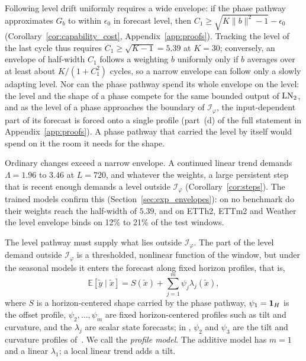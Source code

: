 {
Following level drift uniformly requires a wide envelope: if the phase pathway approximates $G_b$ to within $\epsilon_0$ in forecast level, then $C_1\ge\sqrt{K\|b\|^2-1}-\epsilon_0$ (Corollary~\ref{cor:capability_cost}, Appendix~\ref{app:proofs}). Tracking the level of the last cycle thus requires $C_1\ge\sqrt{K-1}=5.39$ at $K=30$; conversely, an envelope of half-width $C_1$ follows a weighting $b$ uniformly only if $b$ averages over at least about $K/(1+C_1^2)$ cycles, so a narrow envelope can follow only a slowly adapting level. Nor can the phase pathway spend its whole envelope on the level: the level and the shape of a phase compete for the same bounded output of $\operatorname{LN}_2$, and as the level of a phase approaches the boundary of $\mathcal I_\varphi$, the input-dependent part of its forecast is forced onto a single profile (part~(d) of the full statement in Appendix~\ref{app:proofs}). A phase pathway that carried the level by itself would spend on it the room it needs for the shape.

Ordinary changes exceed a narrow envelope. A continued linear trend demands $\Lambda=1.96$ to $3.46$ at $L=720$, and whatever the weights, a large persistent step that is recent enough demands a level outside $\mathcal I_\varphi$ (Corollary~\ref{cor:steps}). The trained models confirm this (Section~\ref{sec:exp_envelopes}): on no benchmark do their weights reach the half-width of $5.39$, and on ETTh2, ETTm2 and Weather the level envelope binds on 12\% to 21\% of the test windows.

The level pathway must supply what lies outside $\mathcal I_\varphi$. The part of the level demand outside $\mathcal I_\varphi$ is a thresholded, nonlinear function of the window, but under the seasonal models it enters the forecast along fixed horizon profiles, that is,
\begin{equation}
\mathbb E[\tilde y\mid\tilde x]=S(\tilde x)+\textstyle\sum_{j=1}^m \psi_j\lambda_j(\tilde x),
\label{eq:profile_model}
\end{equation}
where $S$ is a horizon-centered shape carried by the phase pathway, $\psi_1=\mathbf 1_H$ is the offset profile, $\psi_2,\dots,\psi_m$ are fixed horizon-centered profiles such as tilt and curvature, and the $\lambda_j$ are scalar state forecasts; in \sysplus, $\psi_2$ and $\psi_3$ are the tilt and curvature profiles of~. We call  the \emph{profile model}. The additive model has $m=1$ and a linear $\lambda_1$; a local linear trend adds a tilt.

}
